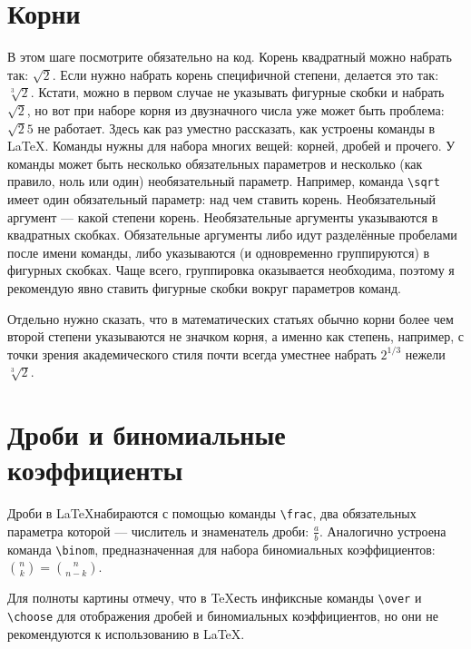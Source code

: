 \section{Корни}
\par В этом шаге посмотрите обязательно на код. Корень квадратный можно набрать так: \( \sqrt{2} \). Если нужно набрать корень специфичной степени, делается это так: \( \sqrt[3]{2} \). Кстати, можно в первом случае не указывать фигурные скобки и набрать \( \sqrt 2 \), но вот при наборе корня из двузначного числа уже может быть проблема: \( \sqrt 25 \) не работает. Здесь как раз уместно рассказать, как устроены команды в \LaTeX. Команды нужны для набора многих вещей: корней, дробей и прочего. У команды может быть несколько обязательных параметров и несколько (как правило, ноль или один) необязательный параметр. Например, команда \verb"\sqrt" имеет один обязательный параметр: над чем ставить корень. Необязательный аргумент --- какой степени корень. Необязательные аргументы указываются в квадратных скобках. Обязательные аргументы либо идут разделённые пробелами после имени команды, либо указываются (и одновременно группируются) в фигурных скобках. Чаще всего, группировка оказывается необходима, поэтому я рекомендую явно ставить фигурные скобки вокруг параметров команд.
\par Отдельно нужно сказать, что в математических статьях обычно корни более чем второй степени указываются не значком корня, а именно как степень, например, с точки зрения академического стиля почти всегда уместнее набрать \( 2^{1/3} \) нежели \( \sqrt[3]{2} \).

\section{Дроби и биномиальные коэффициенты}
\par Дроби в \LaTeX набираются с помощью команды \verb"\frac", два обязательных параметра которой --- числитель и знаменатель дроби: \( \frac{a}{b} \). Аналогично устроена команда \verb"\binom", предназначенная для набора биномиальных коэффициентов: \( \binom{n}{k} = \binom{n}{n-k} \).
\par Для полноты картины отмечу, что в \TeX есть инфиксные команды \verb"\over" и \verb"\choose" для отображения дробей и биномиальных коэффициентов, но они не рекомендуются к использованию в \LaTeX.

